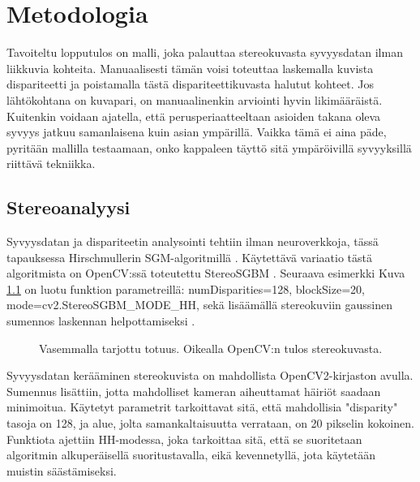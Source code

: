 \chapter{Metodologia}
\label{ch:metodologia}

Tavoiteltu lopputulos on malli, joka palauttaa stereokuvasta syvyysdatan ilman liikkuvia kohteita.
Manuaalisesti tämän voisi toteuttaa laskemalla kuvista dispariteetti ja poistamalla tästä dispariteettikuvasta halutut kohteet.
Jos lähtökohtana on kuvapari, on manuaalinenkin arviointi hyvin likimääräistä. Kuitenkin voidaan ajatella, että perusperiaatteeltaan asioiden takana oleva syvyys jatkuu samanlaisena kuin asian ympärillä.
Vaikka tämä ei aina päde, pyritään mallilla testaamaan, onko kappaleen täyttö sitä ympäröivillä syvyyksillä riittävä tekniikka.

\section{Stereoanalyysi}

Syvyysdatan ja dispariteetin analysointi tehtiin ilman neuroverkkoja,
tässä tapauksessa Hirschmullerin SGM-algoritmillä \cite{hirschmuller2005babel}.
Käytettävä variaatio tästä algoritmista on OpenCV:ssä toteutettu StereoSGBM \cite{opencvsgbm}.
Seuraava esimerkki Kuva \ref{fig:disparity1} on luotu funktion parametreillä: numDisparities=128, blockSize=20, mode=cv2.StereoSGBM\_MODE\_HH,
sekä lisäämällä stereokuviin gaussinen sumennos laskennan helpottamiseksi \cite{AnShiyong2021Asvs}.

\begin{figure}[h]
\centering
{}
\caption[Tämä on lyhyt kuvateksti.]{Vasemmalla tarjottu totuus. Oikealla OpenCV:n tulos stereokuvasta.}
\label{fig:disparity1}
\end{figure}
    
Syvyysdatan kerääminen stereokuvista on mahdollista OpenCV2-kirjaston avulla.
Sumennus lisättiin, jotta mahdolliset kameran aiheuttamat häiriöt saadaan minimoitua.
Käytetyt parametrit tarkoittavat sitä, että mahdollisia "disparity" tasoja on 128, ja alue, jolta samankaltaisuutta verrataan, on 20 pikselin kokoinen.
Funktiota ajettiin HH-modessa, joka tarkoittaa sitä, että se suoritetaan algoritmin alkuperäisellä suoritustavalla, 
eikä kevennetyllä, jota käytetään muistin säästämiseksi.

